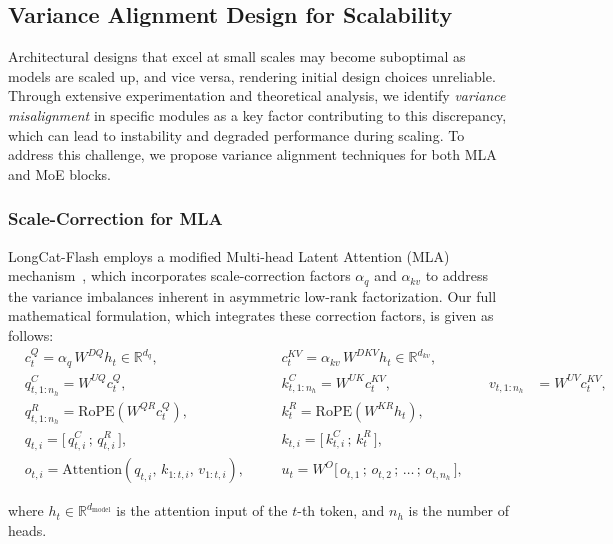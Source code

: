 \documentclass{article}
\newcommand{\longcat}{LongCat-Flash\xspace}
\begin{document}
\subsection{Variance Alignment Design for Scalability}
Architectural designs that excel at small scales may become suboptimal as models are scaled up, and vice versa, rendering initial design choices unreliable. Through extensive experimentation and theoretical analysis, we identify \textit{variance misalignment} in specific modules as a key factor contributing to this discrepancy, which can lead to instability and degraded performance during scaling. To address this challenge, we propose variance alignment techniques for both MLA and MoE blocks.

\subsubsection{Scale-Correction for MLA}
\label{sssec:mla_variance_alignment}
\longcat employs a modified Multi-head Latent Attention (MLA) mechanism~\citep{liu2024deepseek}, which incorporates scale-correction factors $\alpha_q$ and $\alpha_{kv}$ to address the variance imbalances inherent in asymmetric low-rank factorization. Our full mathematical formulation, which integrates these correction factors, is given as follows:
\begin{equation}
\begin{aligned}
    &c_t^Q   = \boxed{\alpha_q}\, W^{DQ} h_t \in \mathbb{R}^{d_q}, 
    &\quad &c_t^{KV} = \boxed{\alpha_{kv}}\, W^{DKV} h_t \in \mathbb{R}^{d_{kv}}, \\[0.8ex]
    &q_{t,1:n_h}^C = W^{UQ} c_t^Q, 
    &\quad &k_{t,1:n_h}^C = W^{UK} c_t^{KV}, 
    &\quad v_{t,1:n_h}   &= W^{UV} c_t^{KV}, \\[0.8ex]
    &q_{t,1:n_h}^R = \mathrm{RoPE}(W^{QR} c_t^Q), 
    &\quad &k_t^R     = \mathrm{RoPE}(W^{KR} h_t), \\[0.8ex]
    &q_{t,i}   = \big[\, q_{t,i}^C \,;\, q_{t,i}^R \,\big], 
    &\quad &k_{t,i}   = \big[\, k_{t,i}^C \,;\, k_t^R \,\big], \\[0.8ex]
    &o_{t,i} = \mathrm{Attention}\!\left(q_{t,i},\, k_{1:t,i},\, v_{1:t,i}\right), 
    &\quad &u_t = W^O \big[\, o_{t,1} \,;\, o_{t,2} \,;\, \dots \,;\, o_{t,n_h} \,\big],
\end{aligned}
\end{equation}

where $h_t \in \mathbb{R}^{d_{\text{model}}}$ is the attention input of the $t$-th token, and $n_h$ is the number of heads.
\end{document}
